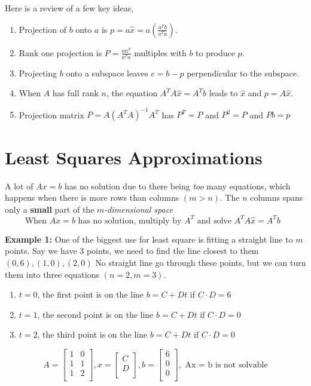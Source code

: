 Here is a review of a few key ideas, 
\begin{enumerate}
    \item Projection of \(b\) onto \(a\) is \(p = a\hat{x} = a(\frac{a^T b}{a^T a})\). 
    \item Rank one projection is \(P = \frac{aa^T}{a^T a}\) multiples with \(b\) to produce \(p\). 
    \item Projecting \(b\) onto a subspace leaves \(e = b - p\) perpendicular to the subspace.
    \item When \(A\) has full rank \(n\), the equation \(A^T A \hat{x} = A^T b\) leads to \(\hat{x}\) and \(p = A\hat{x}\). 
    \item Projection matrix \(P = A(A^T A)^{-1} A^T \) has \(P^T = P\) and \(P^2 = P\) and \(Pb = p\)                 
\end{enumerate}
\section{Least Squares Approximations}

A lot of \(Ax = b\) has no solution due to there being \emph{too} many equations, which happens when there is more rows than columns \((m > n)\). The \(n\) columns spans only a \textbf{small} part of the \emph{\(m\)-dimensional space } 
\[
    \text{When \(Ax = b\) has no solution, multiply by \(A^T\) and solve \(A^T A \hat{x} = A^T b\)   }
\]  

\textbf{Example 1:} One of the biggest use for least square is fitting a straight line to \(m\) points. 
Say we have 3 points, we need to find the line closest to them \((0,6), (1, 0), (2, 0)\)
No straight line go through these points, but we can turn them into three equations \((n = 2, m = 3)\). 
\begin{enumerate}
    \item \(t = 0\), the first point is on the line \(b = C + Dt\) if \(C \cdot D = 6\) 
    \item \(t = 1\), the second point is on the line \(b = C + Dt\) if \(C \cdot D = 0\) 
    \item \(t = 2\), the third point is on the line \(b = C + Dt\) if \(C \cdot D = 0\) 
\end{enumerate}  

\[
    A = 
    \begin{bmatrix}
        1 & 0  \\
        1 & 1  \\
        1 & 2  \\
    \end{bmatrix}, 
    x = 
    \begin{bmatrix}
         C \\
         D \\
    \end{bmatrix}, 
    b = 
    \begin{bmatrix}
         6 \\
         0 \\
         0 \\
    \end{bmatrix}
    , \text{ Ax = b is not solvable}
\]

